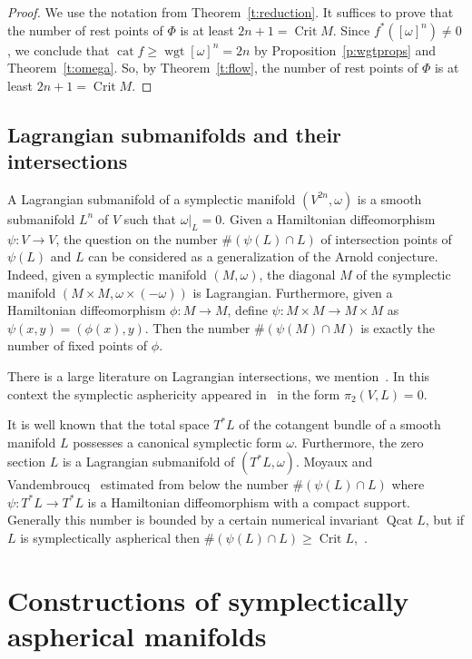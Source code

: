 \documentclass[12pt]{amsart}
\numberwithin{equation}{section}
\theoremstyle{definition}
\theoremstyle{remark}
\newcommand\theoref{Theorem~\ref}
\newcommand\propref{Proposition~\ref}
\numberwithin{figure}{section}
\numberwithin{table}{section}
\newcommand{\om}{{\omega}}
\newcommand{\Mo}{(M,\omega )}
\newcommand\cat{\operatorname{cat}}
\newcommand\qcat{\operatorname{Qcat}}
\newcommand\wgt{\operatorname{wgt}}
\newcommand\Crit{\operatorname{Crit}}
\begin{document}
\begin{proof} 
We use the notation from \theoref{t:reduction}. It suffices to prove that the  
number of rest points of $\Phi$ is at least $2n+1=\Crit M$. Since  
$f^*([\omega]^n)\ne 0$, we conclude that $\cat f \ge \wgt [\om]^n=2n$ by  
\propref{p:wgtprops} and \theoref{t:omega}. So, by \theoref{t:flow}, the number  
of rest points of $\Phi$ is at least  
$2n+1=\Crit M$. 
\end{proof} 
 
 \subsection{Lagrangian submanifolds and their intersections} A Lagrangian 
submanifold of a symplectic manifold $(V^{2n},\omega)$ is a smooth submanifold 
$L^n$ of $V$ such that $\omega|_{L}=0$. Given a Hamiltonian diffeomorphism 
$\psi: 
V \to V$, the question on the number $\#(\psi(L)\cap L)$ of intersection points 
of $\psi(L)$ and $L$ can be considered as a generalization of the Arnold 
conjecture. 
Indeed, given a symplectic manifold $\Mo$, the diagonal $M$ of the symplectic 
manifold 
$(M\times M, \omega \times (-\omega))$ is Lagrangian. Furthermore, given a 
Hamiltonian 
diffeomorphism $\phi: M \to M$, define $\psi: M \times M \to M \times M$ as 
$\psi(x,y)=(\phi(x),y)$. Then the number $\#(\psi(M)\cap M)$ is exactly the 
number of fixed points of $\phi$. 

There is a large literature on Lagrangian intersections, we 
mention~\cite{EG,F,H}. In 
this context the symplectic asphericity appeared in~\cite{F,H} in the form 
$\pi_2(V,L)=0$.

It is well known that the total space $T^*L$ of the cotangent bundle of a smooth 
manifold 
$L$ possesses a canonical symplectic form $\omega$. Furthermore, the zero 
section $L$ is a 
Lagrangian submanifold of $(T^*L,\omega)$. Moyaux and Vandembroucq~\cite{MV} 
estimated from 
below the number $\#(\psi(L)\cap L)$ where $\psi: T^*L \to T^*L$ is a 
Hamiltonian 
diffeomorphism with a compact support. Generally this number is bounded by a 
certain numerical invariant $\qcat L$, but if $L$ is symplectically aspherical 
then 
$\#(\psi(L)\cap L)\ge \Crit L$,~\cite[8.5.1]{CLOT}.


\section{Constructions of symplectically aspherical manifolds} 
\label{S:constructions} 
 
\end{document}
